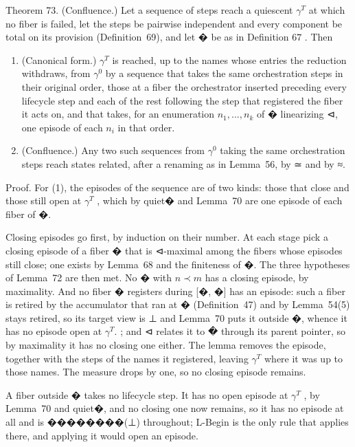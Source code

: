 \documentclass[
  10
]{article}
\begin{document}
Theorem 73. (Confluence.) Let a sequence of steps reach a quiescent
\(\gamma ^ { T }\) at which no fiber is failed, let the steps be
pairwise independent and every component be total on its provision
(Definition~69), and let � be as in Definition \(6 7\) . Then

\begin{enumerate}
\def\labelenumi{\arabic{enumi}.}
\item
  (Canonical form.) \(\gamma ^ { T }\) is reached, up to the names whose
  entries the reduction withdraws, from \(\gamma ^ { 0 }\) by a sequence
  that takes the same orchestration steps in their original order, those
  at a fiber the orchestrator inserted preceding every lifecycle step
  and each of the rest following the step that registered the fiber it
  acts on, and that takes, for an enumeration
  \(n _ { 1 } , . . . , n _ { k }\) of � linearizing ⊲, one episode of
  each \(n _ { i }\) in that order.
\item
  (Confluence.) Any two such sequences from \(\gamma ^ { 0 }\) taking
  the same orchestration steps reach states related, after a renaming as
  in Lemma~56, by ≃ and by ≈.
\end{enumerate}

Proof. For (1), the episodes of the sequence are of two kinds: those
that close and those still open at \(\gamma ^ { T }\) , which by quiet�
and Lemma~70 are one episode of each fiber of �.

Closing episodes go first, by induction on their number. At each stage
pick a closing episode of a fiber � that is ⊲-maximal among the fibers
whose episodes still close; one exists by Lemma~68 and the finiteness of
�. The three hypotheses of Lemma~72 are then met. No � with
\(n \prec m\) has a closing episode, by maximality. And no fiber �
registers during {[}�, �{]} has an episode: such a fiber is retired by
the accumulator that ran at � (Definition~47) and by Lemma~54(5) stays
retired, so its target view is ⊥ and Lemma~70 puts it outside �, whence
it has no episode open at \(\gamma ^ { T } .\) ; and ⊲ relates it to �
through its parent pointer, so by maximality it has no closing one
either. The lemma removes the episode, together with the steps of the
names it registered, leaving \(\gamma ^ { T }\) where it was up to those
names. The measure drops by one, so no closing episode remains.

A fiber outside � takes no lifecycle step. It has no open episode at
\(\gamma ^ { T }\) , by Lemma~70 and quiet�, and no closing one now
remains, so it has no episode at all and is ��������(⊥) throughout;
L-Begin is the only rule that applies there, and applying it would open
an episode.
\end{document}
